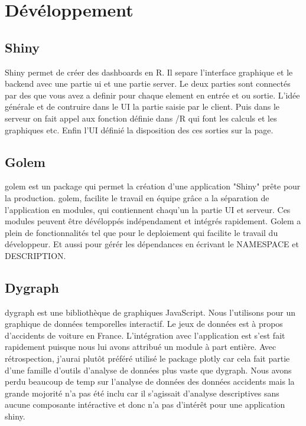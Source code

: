 \documentclass[a4paper, twoside]{article}
\begin{document}
\section{Dévéloppement}

\subsection{Shiny}
Shiny permet de créer des dashboards en R. Il separe l'interface graphique et
le backend avec une partie ui et une partie server. 
Le deux parties sont connectés par des que vous avez a definir pour chaque 
element en entrée et ou sortie. L'idée générale et de contruire dans le UI 
la partie  saisie par le client.
Puis dans le serveur on fait appel aux fonction définie dans /R qui font les 
calculs et les graphiques etc.
Enfin l'UI définié la disposition des ces sorties sur la page.

\subsection{Golem}
golem est un package qui permet la création d'une application "Shiny" prête 
pour la production. golem, facilite le travail en équipe grâce a la séparation 
de l'application en modules, qui contiennent chaqu'un la partie UI et serveur. 
Ces modules peuvent être dévéloppés indépendament et intégrés rapidement.
Golem a plein de fonctionnalités tel que pour le deploiement qui facilite le 
travail du développeur. Et aussi pour gérér les dépendances en écrivant 
le NAMESPACE et DESCRIPTION.


\subsection{Dygraph}
dygraph est une bibliothèque de graphiques JavaScript. Nous l'utilisons pour un 
graphique de données temporelles interactif. Le jeux de données est à propos 
d'accidents de voiture en France. L'intégration avec l'application est s'est 
fait rapidement puisque nous lui avons attribué un module à part entière. 
Avec rétrospection, j'aurai plutôt préféré utilisé le package plotly car cela 
fait partie d'une famille d'outils d'analyse de données plus vaste que dygraph.
Nous avons perdu beaucoup de temp sur l'analyse de données des données accidents 
mais la grande mojorité n'a pas été inclu car il s'agissait d'analyse 
descriptives sans aucune composante intéractive et donc n'a pas d'intérêt pour 
une application shiny.
\end{document}
